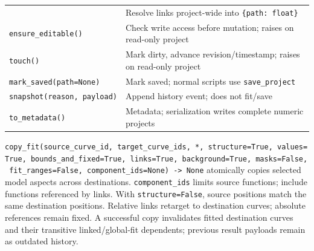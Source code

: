 \documentclass[
  10pt,
  a4paper,
  oneside]{scrreprt}
\begin{document}
\begin{longtable}[]{@{}ll@{}}
\begin{minipage}[t]{0.47\columnwidth}
\end{minipage} & \begin{minipage}[t]{0.47\columnwidth}\raggedright
Resolve links project-wide into \texttt{\{path:\ float\}}\strut
\end{minipage}\tabularnewline
\begin{minipage}[t]{0.47\columnwidth}\raggedright
\texttt{ensure\_editable()}\strut
\end{minipage} & \begin{minipage}[t]{0.47\columnwidth}\raggedright
Check write access before mutation; raises on read-only project\strut
\end{minipage}\tabularnewline
\begin{minipage}[t]{0.47\columnwidth}\raggedright
\texttt{touch()}\strut
\end{minipage} & \begin{minipage}[t]{0.47\columnwidth}\raggedright
Mark dirty, advance revision/timestamp; raises on read-only
project\strut
\end{minipage}\tabularnewline
\begin{minipage}[t]{0.47\columnwidth}\raggedright
\texttt{mark\_saved(path=None)}\strut
\end{minipage} & \begin{minipage}[t]{0.47\columnwidth}\raggedright
Mark saved; normal scripts use \texttt{save\_project}\strut
\end{minipage}\tabularnewline
\begin{minipage}[t]{0.47\columnwidth}\raggedright
\texttt{snapshot(reason,\ payload)}\strut
\end{minipage} & \begin{minipage}[t]{0.47\columnwidth}\raggedright
Append history event; does not fit/save\strut
\end{minipage}\tabularnewline
\begin{minipage}[t]{0.47\columnwidth}\raggedright
\texttt{to\_metadata()}\strut
\end{minipage} & \begin{minipage}[t]{0.47\columnwidth}\raggedright
Metadata; serialization writes complete numeric projects\strut
\end{minipage}\tabularnewline
\bottomrule
\end{longtable}

\texttt{copy\_fit(source\_curve\_id,\ target\_curve\_ids,\ *,\ structure=True,\ values=True,\ bounds\_and\_fixed=True,\ links=True,\ background=True,\ masks=False,\ fit\_ranges=False,\ component\_ids=None)\ -\textgreater{}\ None}
atomically copies selected model aspects across destinations.
\texttt{component\_ids} limits source functions; include functions
referenced by links. With \texttt{structure=False}, source positions
match the same destination positions. Relative links retarget to
destination curves; absolute references remain fixed. A successful copy
invalidates fitted destination curves and their transitive
linked/global-fit dependents; previous result payloads remain as
outdated history.
\end{document}
